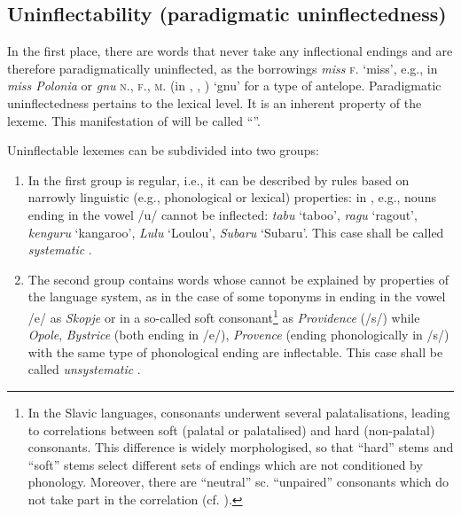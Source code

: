 \documentclass[output=paper,colorlinks,citecolor=brown]{langscibook}
\begin{document}
\subsection{Uninflectability (paradigmatic uninflectedness)} \label{03sec3.2}

In the first place, there are words that never take any inflectional endings and are therefore paradigmatically uninflected, as the borrowings \emph{miss} \textsc{f.} `miss', e.g., in \emph{miss Polonia} or \emph{gnu} \textsc{n.}, \textsc{f.}, \textsc{m.} (in , , ) `gnu' for a type of antelope. Paradigmatic uninflectedness pertains to the lexical level. It is an inherent property of the lexeme. This manifestation of  will be called ``''.

Uninflectable lexemes can be subdivided into two groups:

\begin{enumerate}
	\item In the first group  is regular, i.e., it can be described by rules based on narrowly linguistic (e.g., phonological or lexical) properties: in , e.g., nouns ending in the vowel /u/ cannot be inflected: \emph{tabu} `taboo', \emph{ragu} `ragout', \emph{kenguru} `kangaroo', \emph{Lulu} `Loulou', \emph{Subaru} `Subaru'. This case shall be called \textit{systematic }.
	
	\item The second group contains words whose  cannot be explained by properties of the language system, as in the case of some toponyms in  ending in the vowel /e/ as \emph{Skopje} or in a so-called soft consonant\footnote{In the Slavic languages, consonants underwent several palatalisations, leading to correlations between soft (palatal or palatalised) and hard (non-palatal) consonants. This difference is widely morphologised, so that ``hard'' stems and ``soft'' stems select different sets of endings which are not conditioned by phonology. Moreover, there are ``neutral'' sc. ``unpaired'' consonants which do not take part in the correlation (cf. \citealt[6, 9--10]{comriecorbett1993-intro}).\label{03ftn2}} as \emph{Providence} (/s/) while \emph{Opole}, \emph{Bystrice} (both ending in /e/), \emph{Provence} (ending phonologically in /s/) with the same type of phonological ending are inflectable. This case shall be called \textit{unsystematic }.
\end{enumerate}
\end{document}
